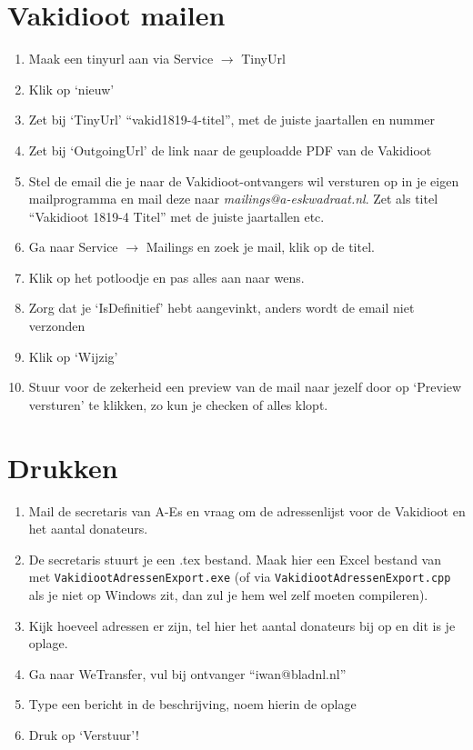 \documentclass{article}
\begin{document}
\section{Vakidioot mailen}
\begin{enumerate}
    \item Maak een tinyurl aan via Service $\to$ TinyUrl
    \item Klik op `nieuw'
    \item Zet bij `TinyUrl' ``vakid1819-4-titel'', met de juiste jaartallen en nummer
    \item Zet bij `OutgoingUrl' de link naar de geuploadde PDF van de Vakidioot
    \item Stel de email die je naar de Vakidioot-ontvangers wil versturen op in je eigen mailprogramma en mail deze naar \emph{mailings@a-eskwadraat.nl}. Zet als titel ``Vakidioot 1819-4 Titel'' met de juiste jaartallen etc.
    \item Ga naar Service $\to$ Mailings en zoek je mail, klik op de titel.
    \item Klik op het potloodje en pas alles aan naar wens.
    \item Zorg dat je `IsDefinitief' hebt aangevinkt, anders wordt de email niet verzonden
    \item Klik op `Wijzig'
    \item Stuur voor de zekerheid een preview van de mail naar jezelf door op `Preview versturen' te klikken, zo kun je checken of alles klopt.
\end{enumerate}

\section{Drukken}
\begin{enumerate}
    \item Mail de secretaris van A-Es en vraag om de adressenlijst voor de Vakidioot en het aantal donateurs.
    \item De secretaris stuurt je een .tex bestand. Maak hier een Excel bestand van met \texttt{VakidiootAdressenExport.exe} (of via \texttt{VakidiootAdressenExport.cpp} als je niet op Windows zit, dan zul je hem wel zelf moeten compileren).
    \item Kijk hoeveel adressen er zijn, tel hier het aantal donateurs bij op en dit is je oplage.
    \item Ga naar WeTransfer, vul bij ontvanger ``iwan@bladnl.nl''
    \item Type een bericht in de beschrijving, noem hierin de oplage
    \item Druk op `Verstuur'!
\end{enumerate}
\end{document}
